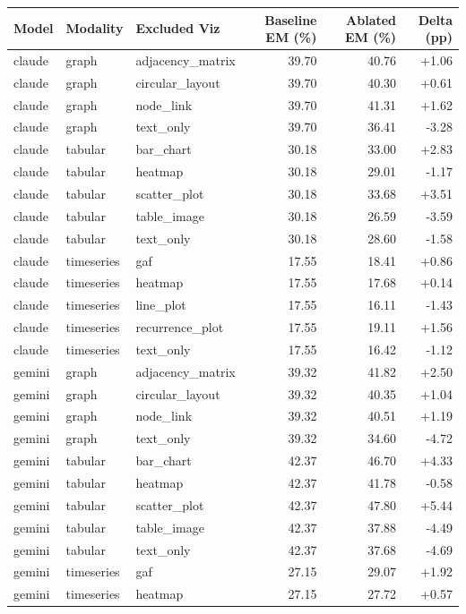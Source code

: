 \begin{tabular}{lllrrr}
\toprule
Model & Modality & Excluded Viz & Baseline EM (\%) & Ablated EM (\%) & Delta (pp) \\
\midrule
claude & graph & adjacency\_matrix & 39.70 & 40.76 & +1.06 \\
claude & graph & circular\_layout & 39.70 & 40.30 & +0.61 \\
claude & graph & node\_link & 39.70 & 41.31 & +1.62 \\
claude & graph & text\_only & 39.70 & 36.41 & -3.28 \\
claude & tabular & bar\_chart & 30.18 & 33.00 & +2.83 \\
claude & tabular & heatmap & 30.18 & 29.01 & -1.17 \\
claude & tabular & scatter\_plot & 30.18 & 33.68 & +3.51 \\
claude & tabular & table\_image & 30.18 & 26.59 & -3.59 \\
claude & tabular & text\_only & 30.18 & 28.60 & -1.58 \\
claude & timeseries & gaf & 17.55 & 18.41 & +0.86 \\
claude & timeseries & heatmap & 17.55 & 17.68 & +0.14 \\
claude & timeseries & line\_plot & 17.55 & 16.11 & -1.43 \\
claude & timeseries & recurrence\_plot & 17.55 & 19.11 & +1.56 \\
claude & timeseries & text\_only & 17.55 & 16.42 & -1.12 \\
gemini & graph & adjacency\_matrix & 39.32 & 41.82 & +2.50 \\
gemini & graph & circular\_layout & 39.32 & 40.35 & +1.04 \\
gemini & graph & node\_link & 39.32 & 40.51 & +1.19 \\
gemini & graph & text\_only & 39.32 & 34.60 & -4.72 \\
gemini & tabular & bar\_chart & 42.37 & 46.70 & +4.33 \\
gemini & tabular & heatmap & 42.37 & 41.78 & -0.58 \\
gemini & tabular & scatter\_plot & 42.37 & 47.80 & +5.44 \\
gemini & tabular & table\_image & 42.37 & 37.88 & -4.49 \\
gemini & tabular & text\_only & 42.37 & 37.68 & -4.69 \\
gemini & timeseries & gaf & 27.15 & 29.07 & +1.92 \\
gemini & timeseries & heatmap & 27.15 & 27.72 & +0.57 \\

\end{tabular}
